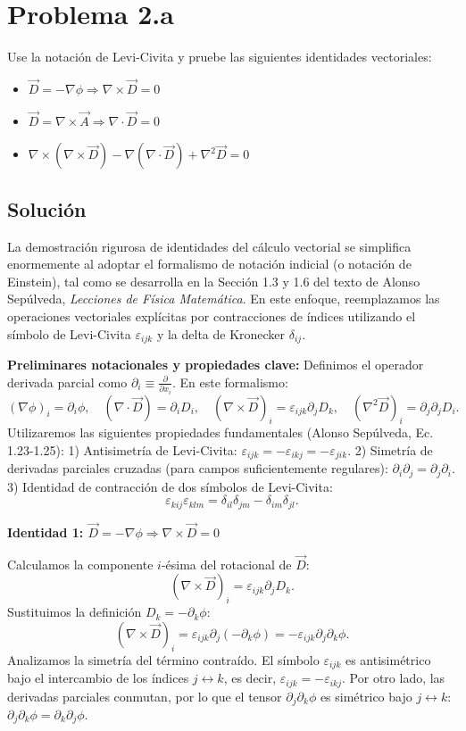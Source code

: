 \documentclass[a4paper]{article}
\begin{document}
\section{Problema 2.a}
Use la notación de Levi-Civita y pruebe las siguientes identidades vectoriales:
\begin{itemize}
\item $\vec{D} = -\nabla \phi \Rightarrow \nabla \times \vec{D} = 0$
\item $\vec{D} = \nabla \times \vec{A} \Rightarrow \nabla \cdot \vec{D} = 0$
\item $\nabla \times (\nabla \times \vec{D}) - \nabla(\nabla \cdot \vec{D}) + \nabla^2 \vec{D} = 0$
\end{itemize}

\subsection{Solución}
La demostración rigurosa de identidades del cálculo vectorial se simplifica enormemente al adoptar el formalismo de notación indicial (o notación de Einstein), tal como se desarrolla en la Sección 1.3 y 1.6 del texto de Alonso Sepúlveda, \textit{Lecciones de Física Matemática}. En este enfoque, reemplazamos las operaciones vectoriales explícitas por contracciones de índices utilizando el símbolo de Levi-Civita $\varepsilon_{ijk}$ y la delta de Kronecker $\delta_{ij}$.

\noindent\textbf{Preliminares notacionales y propiedades clave:}
Definimos el operador derivada parcial como $\partial_i \equiv \frac{\partial}{\partial x_i}$. En este formalismo:
$$
(\nabla \phi)_i = \partial_i \phi, \quad (\nabla \cdot \vec{D}) = \partial_i D_i, \quad (\nabla \times \vec{D})_i = \varepsilon_{ijk} \partial_j D_k, \quad (\nabla^2 \vec{D})_i = \partial_j \partial_j D_i.
$$
Utilizaremos las siguientes propiedades fundamentales (Alonso Sepúlveda, Ec. 1.23-1.25):
1) Antisimetría de Levi-Civita: $\varepsilon_{ijk} = -\varepsilon_{ikj} = -\varepsilon_{jik}$.
2) Simetría de derivadas parciales cruzadas (para campos suficientemente regulares): $\partial_i \partial_j = \partial_j \partial_i$.
3) Identidad de contracción de dos símbolos de Levi-Civita:
$$
\varepsilon_{kij} \varepsilon_{klm} = \delta_{il}\delta_{jm} - \delta_{im}\delta_{jl}.
$$

\vspace{0.3cm}
\noindent\textbf{Identidad 1: $\vec{D} = -\nabla \phi \Rightarrow \nabla \times \vec{D} = 0$}

Calculamos la componente $i$-ésima del rotacional de $\vec{D}$:
$$
(\nabla \times \vec{D})_i = \varepsilon_{ijk} \partial_j D_k.
$$
Sustituimos la definición $D_k = -\partial_k \phi$:
$$
(\nabla \times \vec{D})_i = \varepsilon_{ijk} \partial_j (-\partial_k \phi) = -\varepsilon_{ijk} \partial_j \partial_k \phi.
$$
Analizamos la simetría del término contraído. El símbolo $\varepsilon_{ijk}$ es antisimétrico bajo el intercambio de los índices $j \leftrightarrow k$, es decir, $\varepsilon_{ijk} = -\varepsilon_{ikj}$. Por otro lado, las derivadas parciales conmutan, por lo que el tensor $\partial_j \partial_k \phi$ es simétrico bajo $j \leftrightarrow k$: $\partial_j \partial_k \phi = \partial_k \partial_j \phi$.
\end{document}
